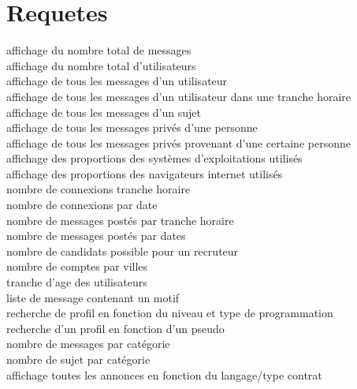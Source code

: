 \documentclass{report}
\begin{document}
\section{Requetes}
affichage du nombre total de messages\\
affichage du nombre total d’utilisateurs\\
affichage de tous les messages d'un utilisateur\\
affichage de tous les messages d'un utilisateur dans une tranche horaire\\
affichage de tous les messages d'un sujet\\
affichage de tous les messages privés d'une personne\\
affichage de tous les messages privés provenant d'une certaine personne\\
affichage des proportions des systèmes d'exploitations utilisés\\
affichage des proportions des navigateurs internet utilisés\\
nombre de connexions tranche horaire\\
nombre de connexions par date\\
nombre de messages postés par tranche horaire\\
nombre de messages postés par dates\\
nombre de candidats possible pour un recruteur\\
nombre de comptes par villes\\
tranche d’age des utilisateurs\\
liste de message contenant un motif\\
recherche de profil en fonction du niveau et type de programmation\\
recherche d'un profil en fonction d'un pseudo\\
nombre de messages par catégorie\\
nombre de sujet par catégorie\\
affichage toutes les annonces en fonction du langage/type contrat\\
\end{document}
